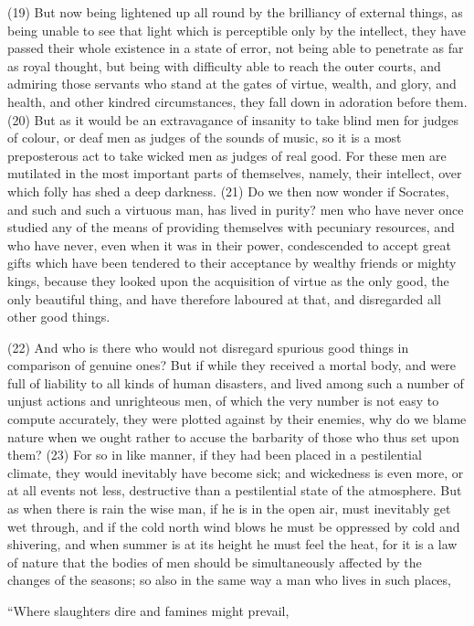 (19) But now being lightened up all round by the brilliancy of external things, as being unable to see
that light which is perceptible only by the intellect, they have passed their whole existence in a state
of error, not being able to penetrate as far as royal thought, but being with difficulty able to reach
the outer courts, and admiring those servants who stand at the gates of virtue, wealth, and glory,
and health, and other kindred circumstances, they fall down in adoration before them. (20) But as it
would be an extravagance of insanity to take blind men for judges of colour, or deaf men as judges
of the sounds of music, so it is a most preposterous act to take wicked men as judges of real
good. For these men are mutilated in the most important parts of themselves, namely, their
intellect, over which folly has shed a deep darkness. (21) Do we then now wonder if Socrates, and
such and such a virtuous man, has lived in purity? men who have never once studied any of the
means of providing themselves with pecuniary resources, and who have never, even when it was
in their power, condescended to accept great gifts which have been tendered to their acceptance
by wealthy friends or mighty kings, because they looked upon the acquisition of virtue as the only
good, the only beautiful thing, and have therefore laboured at that, and disregarded all other good
things.

(22) And who is there who would not disregard spurious good things in comparison of genuine
ones? But if while they received a mortal body, and were full of liability to all kinds of human
disasters, and lived among such a number of unjust actions and unrighteous men, of which the
very number is not easy to compute accurately, they were plotted against by their enemies, why do
we blame nature when we ought rather to accuse the barbarity of those who thus set upon them?
(23) For so in like manner, if they had been placed in a pestilential climate, they would inevitably
have become sick; and wickedness is even more, or at all events not less, destructive than a
pestilential state of the atmosphere. But as when there is rain the wise man, if he is in the open air,
must inevitably get wet through, and if the cold north wind blows he must be oppressed by cold and
shivering, and when summer is at its height he must feel the heat, for it is a law of nature that the
bodies of men should be simultaneously affected by the changes of the seasons; so also in the
same way a man who lives in such places,

``Where slaughters dire and famines might prevail,

